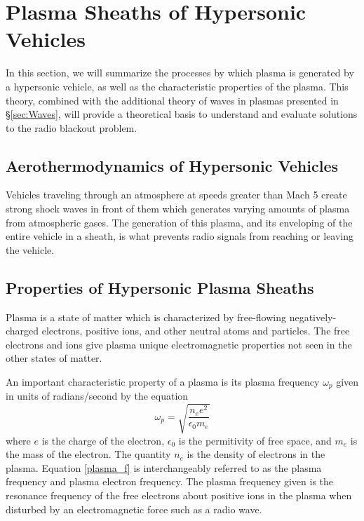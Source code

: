 \documentclass[twocolumn]{article}
\begin{document}
\section{Plasma Sheaths of Hypersonic Vehicles} \label{sec:PlasmaSheaths}
In this section, we will summarize the processes by which plasma is generated by a hypersonic vehicle, as well as the characteristic properties of the plasma.
This theory, combined with the additional theory of waves in plasmas presented in \S\ref{sec:Waves}, will provide a theoretical basis to understand and evaluate solutions to the radio blackout problem.

\subsection*{Aerothermodynamics of Hypersonic Vehicles}
Vehicles traveling through an atmosphere at speeds greater than Mach 5 create strong shock waves in front of them which generates varying amounts of plasma from atmospheric gases.
The generation of this plasma, and its enveloping of the entire vehicle in a sheath, is what prevents radio signals from reaching or leaving the vehicle.

\subsection*{Properties of Hypersonic Plasma Sheaths}
Plasma is a state of matter which is characterized by free-flowing negatively-charged electrons, positive ions, and other neutral atoms and particles.
The free electrons and ions give plasma unique electromagnetic properties not seen in the other states of matter.

An important characteristic property of a plasma is its plasma frequency $\omega_p$ given in units of radians/second by the equation
\begin{equation} \label{plasma_f}
\omega_p = \sqrt{\frac{n_e e^2}{\epsilon_0 m_e}}
\end{equation}
where $e$ is the charge of the electron, $\epsilon_0$ is the permitivity of free space, and $m_e$ is the mass of the electron. 
The quantity $n_e$ is the density of electrons in the plasma.\cite{chen_introduction_1984,kim_analysis_2008}
Equation \ref{plasma_f} is interchangeably referred to as the plasma frequency and plasma electron frequency. The plasma frequency given is the resonance frequency of the free electrons about positive ions in the plasma when disturbed by an electromagnetic force such as a radio wave.\cite{chen_introduction_1984}
\end{document}
